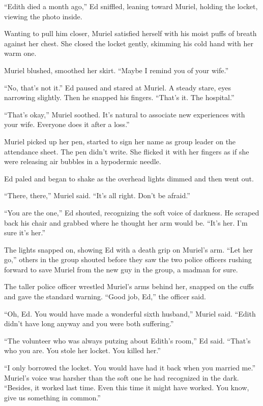 \documentclass[twoside,10pt]{book}
\begin{document}
``Edith died a month ago,'' Ed sniffled, leaning toward Muriel, holding
the locket, viewing the photo inside.

Wanting to pull him closer, Muriel satisfied herself with his moist
puffs of breath against her chest. She closed the locket gently,
skimming his cold hand with her warm one.

Muriel blushed, smoothed her skirt. ``Maybe I remind you of your wife.''

``No, that's not it.'' Ed paused and stared at Muriel. A steady stare,
eyes narrowing slightly. Then he snapped his fingers. ``That's it. The
hospital.''

``That's okay,'' Muriel soothed. It's natural to associate new
experiences with your wife. Every­one does it after a loss.''

Muriel picked up her pen, started to sign her name as group leader on
the attendance sheet. The pen didn't write. She flicked it with her
fingers as if she were releasing air bubbles in a hypodermic needle.

Ed paled and began to shake as the overhead lights dimmed and then went
out.

``There, there,'' Muriel said. ``It's all right. Don't be afraid.''

``You are the one,'' Ed shouted, recognizing the soft voice of darkness.
He scraped back his chair and grabbed where he thought her arm would be.
``It's her. I'm sure it's her.''

The lights snapped on, showing Ed with a death grip on Muriel's arm.
``Let her go,'' others in the group shouted before they saw the two
police officers rushing forward to save Muriel from the new guy in the
group, a madman for sure.

The taller police officer wrestled Muriel's arms behind her, snapped on
the cuffs and gave the standard warning. ``Good job, Ed,'' the officer
said.

``Oh, Ed. You would have made a wonderful sixth husband,'' Muriel said.
``Edith didn't have long anyway and you were both suffering.''

``The volunteer who was always putzing about Edith's room,'' Ed said.
``That's who you are. You stole her locket. You killed her.''

``I only borrowed the locket. You would have had it back when you
married me.'' Muriel's voice was harsher than the soft one he had
recognized in the dark. ``Besides, it worked last time. Even this time
it might have worked. You know, give us something in common.''
\end{document}
